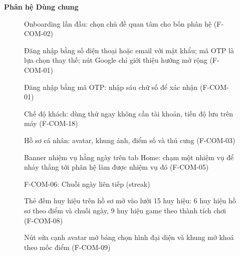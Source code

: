 \textbf{Phân hệ Dùng chung}\\[6pt]
\begin{figure}[H]
\centering
{}
\caption{\small Onboarding lần đầu: chọn chủ đề quan tâm cho bốn phân hệ (F-COM-02)}
\end{figure}
\begin{figure}[H]
\centering
{}
\caption{\small Đăng nhập bằng số điện thoại hoặc email với mật khẩu; mã OTP là lựa chọn thay thế; nút Google chỉ giới thiệu hướng mở rộng (F-COM-01)}
\end{figure}
\begin{figure}[H]
\centering
{}
\caption{\small Đăng nhập bằng mã OTP: nhập sáu chữ số để xác nhận (F-COM-01)}
\end{figure}
\begin{figure}[H]
\centering
{}
\caption{\small Chế độ khách: dùng thử ngay không cần tài khoản, tiến độ lưu trên máy (F-COM-18)}
\end{figure}
\begin{figure}[H]
\centering
{}
\caption{\small Hồ sơ cá nhân: avatar, khung ảnh, điểm số và thú cưng (F-COM-03)}
\end{figure}
\begin{figure}[H]
\centering
{}
\caption{\small Banner nhiệm vụ hằng ngày trên tab Home: chạm một nhiệm vụ để nhảy thẳng tới phân hệ làm được nhiệm vụ đó (F-COM-05)}
\end{figure}
\begin{figure}[H]
\centering
{}
\caption{\small F-COM-06: Chuỗi ngày liên tiếp (streak)}
\end{figure}
\begin{figure}[H]
\centering
{}
\caption{\small Thẻ đếm huy hiệu trên hồ sơ mở vào lưới 15 huy hiệu: 6 huy hiệu hồ sơ theo điểm và chuỗi ngày, 9 huy hiệu game theo thành tích chơi (F-COM-08)}
\end{figure}
\begin{figure}[H]
\centering
{}
\caption{\small Nút sửa cạnh avatar mở bảng chọn hình đại diện và khung mở khoá theo mốc điểm (F-COM-09)}
\end{figure}
